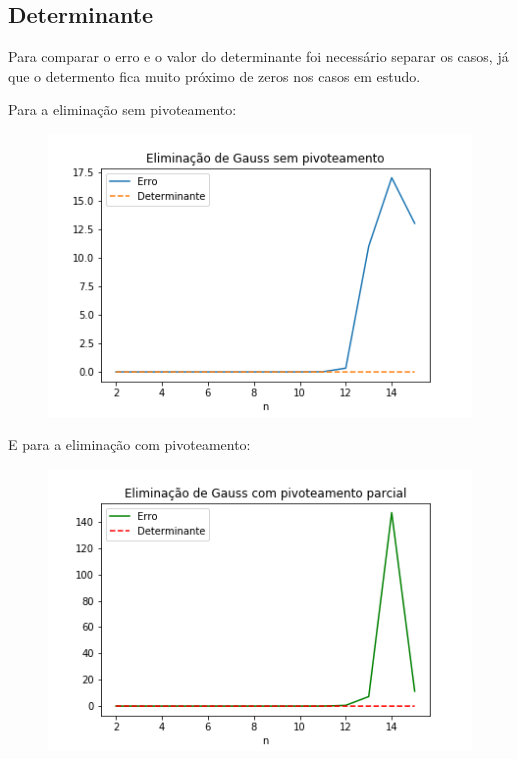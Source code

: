 \documentclass{article}
\begin{document}
\subsection{Determinante}

\par Para comparar o erro e o valor do determinante foi necessário separar os casos, já que o determento fica muito próximo de zeros nos casos em estudo.
\par Para a eliminação sem pivoteamento:

\newpage

\begin{figure}
    \centering
    \includegraphics[scale=0.5]{image4.png}
    \label{fig:my_label}
\end{figure}

\par E para a eliminação com pivoteamento:
 
 \begin{figure}[ht]
     \centering
     \includegraphics[scale=0.5]{image5.png}
     \label{fig:my_label}
 \end{figure}
\end{document}
